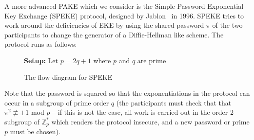 A more advanced PAKE which we consider is the Simple Password Exponential Key Exchange (SPEKE) protocol, 
designed by Jablon~\cite{Ja96} in 1996.  SPEKE tries to work around the deficiencies of EKE by using
the shared password $\pi$ of the two participants to change the generator of a Diffie-Hellman like 
scheme.  The protocol runs as follows:

\begin{figure}[h]
\textbf{Setup:} Let $p = 2q + 1$ where $p$ and $q$ are prime
    \caption{The flow diagram for SPEKE}
    \label{fig:SPEKE}
\end{figure}

Note that the password is squared so that the exponentiations in the protocol can occur in a subgroup of prime order $q$ (the participants must
check that that $\pi^2 \not\equiv \pm 1$ mod $p$ -- if this is not the case, all work is carried out in the order 2 subgroup of $\mathbb{Z}_p^*$ which renders the protocol insecure, and a new password or prime $p$ must be chosen).  

